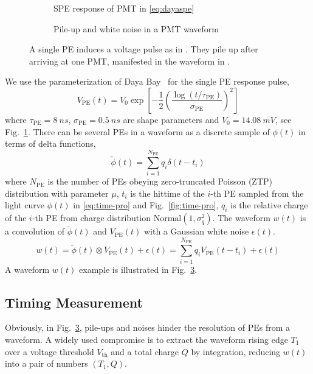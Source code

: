 \begin{figure}[H]
  \begin{subfigure}{.49\textwidth}
    \centering
    \resizebox{\textwidth}{!}{}
    \caption{\label{fig:spe} SPE response of PMT in \eqref{eq:dayaspe}}
  \end{subfigure}
  \begin{subfigure}{.49\textwidth}
    \centering
    \resizebox{\textwidth}{!}{}
    \caption{\label{fig:pile} Pile-up and white noise in a PMT waveform}
  \end{subfigure}
  \caption{A single PE induces a voltage pulse as in .  They pile up after arriving at one PMT, manifested in the waveform in .}
\end{figure}

We use the parameterization of Daya Bay~\cite{jetter_pmt_2012} for the single PE response pulse,
\begin{equation}
  V_\mathrm{PE}(t) = V_{0}\exp\left[-\frac{1}{2}\left(\frac{\log(t/\tau_\mathrm{PE})}{\sigma_\mathrm{PE}}\right)^{2}\right]
  \label{eq:dayaspe}
\end{equation}
where $\tau_\mathrm{PE}=\SI{8}{ns}$, $\sigma_\mathrm{PE}=\SI{0.5}{ns}$ are shape parameters and $V_{0}=\SI{14.08}{mV}$, see Fig.~\ref{fig:spe}.  There can be several PEs in a waveform as a discrete sample of $\phi(t)$ in terms of delta functions,
\begin{equation}
  \label{eq:lc-sample}
  \tilde{\phi}(t) = \sum_{i=1}^{N_{\mathrm{PE}}} q_i \delta(t-t_i)
\end{equation}
where $N_\mathrm{PE}$ is the number of PEs obeying zero-truncated Poisson (ZTP) distribution with parameter $\mu$, $t_i$ is the hittime of the $i$-th PE sampled from the light curve $\phi(t)$ in \eqref{eq:time-pro} and Fig.~\ref{fig:time-pro}, $q_i$ is the relative charge of the $i$-th PE from charge distribution $\mathrm{Normal}(1,\sigma_{q}^2)$.  The waveform $w(t)$ is a convolution of $\tilde{\phi}(t)$ and $V_\mathrm{PE}(t)$ with a Gaussian white noise $\epsilon(t)$.
\begin{equation}
  \label{eq:1}
  w(t) = \tilde{\phi}(t) \otimes V_\mathrm{PE}(t) + \epsilon(t) =  \sum_{i=1}^{N_\mathrm{PE}} q_i V_\mathrm{PE}(t-t_i) + \epsilon(t)
\end{equation}
A waveform $w(t)$ example is illustrated in Fig.~\ref{fig:pile}.

\subsection{Timing Measurement}
Obviously, in Fig.~\ref{fig:pile}, pile-ups and noises hinder the resolution of PEs from a waveform.  A widely used compromise is to extract the waveform rising edge $T_1$ over a voltage threshold $V_\mathrm{th}$ and a total charge $Q$ by integration, reducing $w(t)$ into a pair of numbers $(T_1, Q)$.

